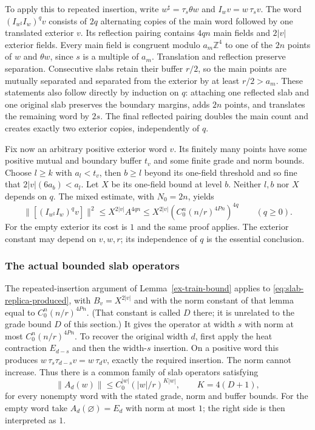 To apply this to repeated insertion, write $w^\sharp=\tau_s\theta w$
and $I_wv=w\,\tau_sv$. The word
$(I_{w^\sharp}I_w)^qv$ consists of $2q$ alternating copies of the
main word followed by one translated exterior $v$. Its reflection
pairing contains $4qn$ main fields and $2|v|$ exterior fields. Every
main field is congruent modulo $a_m\mathbb Z^4$ to one of the $2n$
points of $w$ and $\theta w$, since $s$ is a multiple of $a_m$.
Translation and reflection preserve separation. Consecutive slabs
retain their buffer $r/2$, so the main points are mutually separated
and separated from the exterior by at least $r/2>a_m$.
These statements also follow directly by induction on $q$: attaching
one reflected slab and one original slab preserves the boundary
margins, adds $2n$ points, and translates the remaining word by $2s$.
The final reflected pairing doubles the main count and creates exactly
two exterior copies, independently of $q$.

Fix now an arbitrary positive exterior word $v$. Its finitely many
points have some positive mutual and boundary buffer $t_v$ and some
finite grade and norm bounds. Choose $l\geq k$ with $a_l<t_v$,
then $b\geq l$ beyond its one-field threshold and so fine that
$2|v|(6a_b)<a_l$. Let $X$ be its one-field bound at level $b$.
Neither $l,b$ nor $X$ depends on $q$. The mixed estimate, with
$N_0=2n$, yields
\begin{equation}\label{eq:slab-replica-produced}
 \big\|[(I_{w^\sharp}I_w)^qv]\big\|^2
 \leq X^{2|v|} A^{4qn}
 \leq X^{2|v|}\left(C_0^n(n/r)^{4Pn}\right)^{4q}
 \qquad(q\geq0).
\end{equation}
For the empty exterior its cost is $1$ and the same proof applies.
The exterior constant may depend on $v,w,r$; its independence of $q$
is the essential conclusion.

\subsubsection{The actual bounded slab operators}

The repeated-insertion argument of Lemma~\ref{ex-train-bound} applies
to \eqref{eq:slab-replica-produced}, with $B_v=X^{2|v|}$ and with the
norm constant of that lemma equal to $C_0^n(n/r)^{4Pn}$. (That constant is
called $D$ there; it is unrelated to the grade bound $D$ of this section.)
It gives the operator at width $s$ with norm at most $C_0^n(n/r)^{4Pn}$. To recover the original width $d$,
first apply the heat contraction $E_{d-s}$ and then the width-$s$
insertion. On a positive word this produces
$w\,\tau_s\tau_{d-s}v=w\,\tau_dv$, exactly the required insertion.
The norm cannot increase. Thus there is a common family of slab
operators satisfying
\begin{equation}\label{eq:slab-allcopy-produced}
       \|A_d(w)\|\leq C_0^{|w|}(|w|/r)^{K|w|},\qquad K=4(D+1),
\end{equation}
for every nonempty word with the stated grade, norm and buffer bounds.
For the empty word take $A_d(\varnothing)=E_d$ with norm at most $1$;
the right side is then interpreted as $1$.

